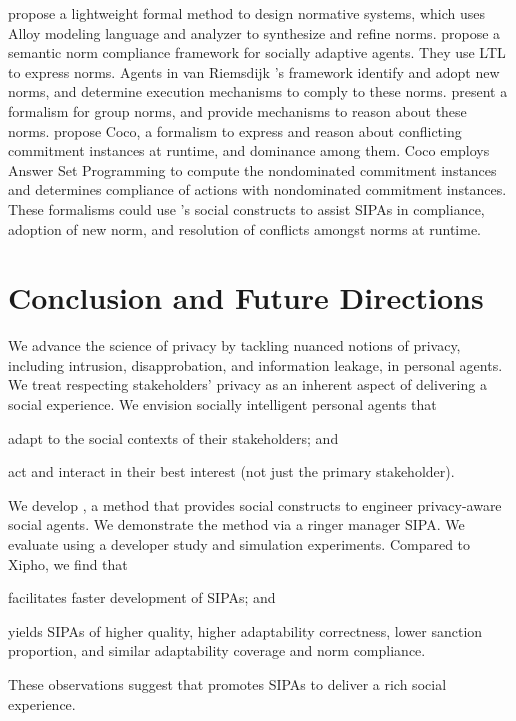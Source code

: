 \citet{Hao-FSE16-Norms+formal} propose a lightweight formal
method to design normative systems, which uses Alloy modeling language
and analyzer to synthesize and refine norms. 
 propose a semantic norm
compliance framework for socially adaptive agents. They use LTL to
express norms. Agents in van Riemsdijk {\etal}'s framework identify and
adopt new norms, and determine execution mechanisms to comply to these
norms. \citet{Aldewereld-TAAS16-GroupNorms} present a
formalism for group norms, and provide mechanisms to reason about these
norms. \citet{Ajmeri-IJCAI16-Coco} propose Coco, a
formalism to express and reason about conflicting commitment instances
at runtime, and dominance among them. Coco employs Answer Set
Programming to compute the nondominated commitment instances and
determines compliance of actions with nondominated commitment instances.
These formalisms could use \frameworkA's social constructs to assist
SIPAs in compliance, adoption of new norm, and resolution of conflicts
amongst norms at runtime.

\section{Conclusion and Future Directions}
\label{sec:arnor-discussion}

We advance the science of privacy by tackling nuanced notions of
privacy, including intrusion, disapprobation, and information leakage,
in personal agents. We treat respecting stakeholders' privacy as an
inherent aspect of delivering a social experience. We envision socially
intelligent personal agents that
\begin{enumerate*}[label=(\arabic*)]
\item adapt to the social contexts of their stakeholders; and
\item act and interact in their best interest (not just the primary stakeholder).  
\end{enumerate*}

We develop \frameworkA, a method that provides social constructs to
engineer privacy-aware social agents. We demonstrate the method via a
ringer manager SIPA. We evaluate \frameworkA using a developer study and
simulation experiments. Compared to Xipho, we find that \frameworkA
\begin{enumerate*}[label=(\arabic*)]
\item facilitates faster development of SIPAs; and
\item yields SIPAs of higher quality, higher adaptability correctness, 
lower sanction proportion, and similar adaptability coverage and norm compliance.
\end{enumerate*}
These observations suggest that \frameworkA promotes SIPAs to deliver a rich 
social experience.

